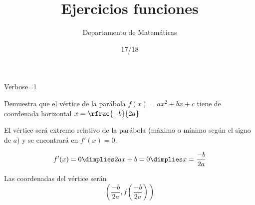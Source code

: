 \documentclass[palatino,nosec]{Docencia}
\title{Ejercicios funciones}
\author{Departamento de Matemáticas}
\date{17/18}
\begin{document}
\pagestyle{plain}

\newif\ifverbose
\verbosetrue

\ifverbose
\begin{sagesilent}
	Verbose=1
\end{sagesilent}
\else
\begin{sagesilent}
	Verbose=0
\end{sagesilent}
\fi



\begin{problem} Demuestra que el vértice de la parábola $f(x) = ax^2+bx+c$ tiene de coordenada horizontal $x=\rfrac{-b}{2a}$
\solution

El vértice será extremo relativo de la parábola (máximo o mínimo según el signo de $a$) y se encontrará en $f'(x) = 0$.

\[f'(x) = 0 \dimplies 2ax+b=0 \dimplies x=\frac{-b}{2a}\]

Las coordenadas del vértice serán \[\left(\frac{-b}{2a},f\left(\frac{-b}{2a}\right) \right)\]


\end{problem}
\end{document}
